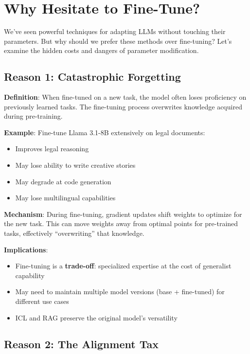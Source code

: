 \documentclass{article}
\begin{document}
\section{Why Hesitate to Fine-Tune?}

We've seen powerful techniques for adapting LLMs without touching their parameters. But why should we prefer these methods over fine-tuning? Let's examine the hidden costs and dangers of parameter modification.

\subsection{Reason 1: Catastrophic Forgetting}

\textbf{Definition}: When fine-tuned on a new task, the model often loses proficiency on previously learned tasks. The fine-tuning process overwrites knowledge acquired during pre-training.

\begin{center}
\end{center}

\textbf{Example}: Fine-tune Llama 3.1-8B extensively on legal documents:
\begin{itemize}
\item[$+$] Improves legal reasoning
\item[$-$] May lose ability to write creative stories
\item[$-$] May degrade at code generation
\item[$-$] May lose multilingual capabilities
\end{itemize}

\textbf{Mechanism}: During fine-tuning, gradient updates shift weights to optimize for the new task. This can move weights away from optimal points for pre-trained tasks, effectively ``overwriting'' that knowledge.

\textbf{Implications}:
\begin{itemize}
\item Fine-tuning is a \textbf{trade-off}: specialized expertise at the cost of generalist capability
\item May need to maintain multiple model versions (base + fine-tuned) for different use cases
\item ICL and RAG preserve the original model's versatility
\end{itemize}

\subsection{Reason 2: The Alignment Tax}
\end{document}
